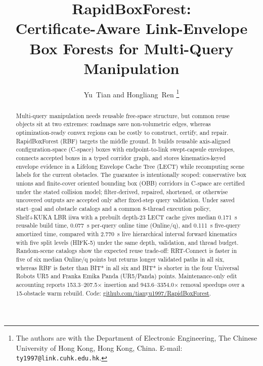 \documentclass[journal]{IEEEtran}
\DeclareRobustCommand{\textsc}[1]{\textnormal{\MakeUppercase{#1}}}
\newcommand{\rbf}{\textsc{RBF}}
\newcommand{\cspace}{\mbox{C-space}}
\newcommand{\onlineq}{\mbox{Online/q}}
\begin{document}
\title{RapidBoxForest:\\ Certificate-Aware Link-Envelope Box Forests for Multi-Query Manipulation}

\author{Yu~Tian and Hongliang~Ren%
\thanks{The authors are with the Department of Electronic Engineering,
The Chinese University of Hong Kong, Hong Kong, China.
E-mail: \texttt{ty1997@link.cuhk.edu.hk}.}}

\maketitle

\begin{abstract}
Multi-query manipulation needs reusable free-space structure, but common reuse
objects sit at two extremes: roadmaps save non-volumetric edges, whereas
optimization-ready convex regions can be costly to construct, certify, and
repair. RapidBoxForest (\rbf{}) targets the middle ground. It builds reusable
axis-aligned configuration-space (\cspace{}) boxes with endpoint-to-link
swept-capsule envelopes, connects accepted boxes in a typed corridor graph, and
stores kinematics-keyed envelope evidence in a Lifelong Envelope Cache Tree
(LECT) while recomputing scene labels for the current obstacles. The guarantee
is intentionally scoped: conservative box unions and finite-cover oriented
bounding box (OBB) corridors in \cspace{} are certified under the stated
collision model;
filter-derived, repaired, shortened, or otherwise uncovered outputs are
accepted only after fixed-step query validation. Under saved start--goal and
obstacle catalogs and a common 8-thread execution policy, Shelf+KUKA LBR iiwa
with a prebuilt depth-23 LECT cache gives median 0.171~s reusable build time,
0.077~s per-query online time (\onlineq{}), and 0.111~s five-query amortized
time, compared with 2.770~s live hierarchical interval forward kinematics with
five split levels (\mbox{HIFK-5}) under the same depth, validation, and thread
budget. Random-scene catalogs show the expected
reuse trade-off: \mbox{RRT-Connect} is faster in five of six median \onlineq{}
points but returns longer validated paths in all six, whereas \rbf{} is faster
than BIT* in all six and BIT* is shorter in the four Universal Robots UR5 and
Franka Emika Panda (UR5/Panda) points. Maintenance-only edit accounting reports
153.3--207.5$\times$ insertion and 943.6--3354.0$\times$ removal speedups over a
15-obstacle warm rebuild. Code:
\href{https://github.com/tianyu1997/RapidBoxForest}{github.com/tianyu1997/RapidBoxForest}.
\end{abstract}
\end{document}
